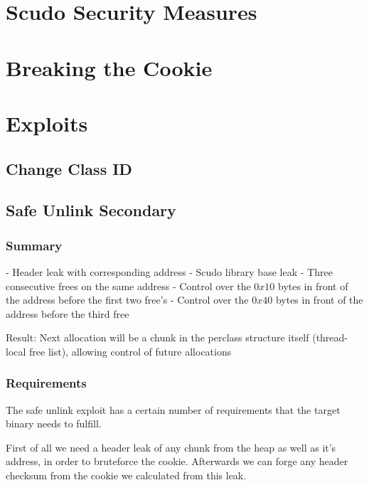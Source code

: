 \documentclass[a4paper,11pt,oneside]{report}
\begin{document}
\chapter{Scudo Security Measures}



\chapter{Breaking the Cookie}



\chapter{Exploits}

\section{Change Class ID}



\section{Safe Unlink Secondary}


\subsection{Summary}

- Header leak with corresponding address
- Scudo library base leak
- Three consecutive frees on the same address
  - Control over the $0x10$ bytes in front of the address before the first two free's
  - Control over the $0x40$ bytes in front of the address before the third free

Result:
Next allocation will be a chunk in the perclass structure itself (thread-local free list), allowing control of future allocations


\subsection{Requirements}

The safe unlink exploit has a certain number of requirements that the target binary needs to fulfill.

First of all we need a header leak of any chunk from the heap as well as it's address, in order to bruteforce the cookie. Afterwards we can forge any header checksum from the cookie we calculated from this leak.
\end{document}
